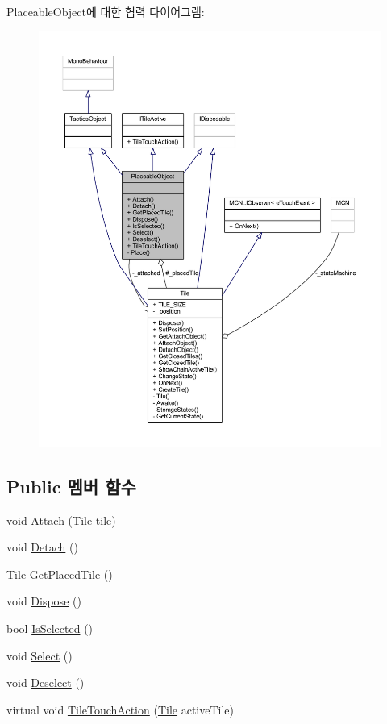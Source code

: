 Placeable\+Object에 대한 협력 다이어그램\+:\nopagebreak
\begin{figure}[H]
\begin{center}
\leavevmode
\includegraphics[width=350pt]{class_placeable_object__coll__graph}
\end{center}
\end{figure}
\subsection*{Public 멤버 함수}
\begin{DoxyCompactItemize}
\item 
void \hyperlink{class_placeable_object_a3176ec3d5d26b2a83cdc58b01e630aa1}{Attach} (\hyperlink{class_tile}{Tile} tile)
\item 
void \hyperlink{class_placeable_object_aef2018b58bf7c8c0fab5aaf3d9a154d4}{Detach} ()
\item 
\hyperlink{class_tile}{Tile} \hyperlink{class_placeable_object_ab44a9b122632ac3cf0babb5040e8a201}{Get\+Placed\+Tile} ()
\item 
void \hyperlink{class_placeable_object_a8bd49b7db556556502a0518fc833be48}{Dispose} ()
\item 
bool \hyperlink{class_placeable_object_a71fd42914caa0dc6229fe6a5ffe09b99}{Is\+Selected} ()
\item 
void \hyperlink{class_placeable_object_a019818f3f6c6eb715fed163efa921f5a}{Select} ()
\item 
void \hyperlink{class_placeable_object_a0c1248b1f9981ddbf68e6f70a6498f3d}{Deselect} ()
\item 
virtual void \hyperlink{class_placeable_object_ae61aaa6cf5c16ca879efe8cba08fdfcf}{Tile\+Touch\+Action} (\hyperlink{class_tile}{Tile} active\+Tile)
\end{DoxyCompactItemize}
